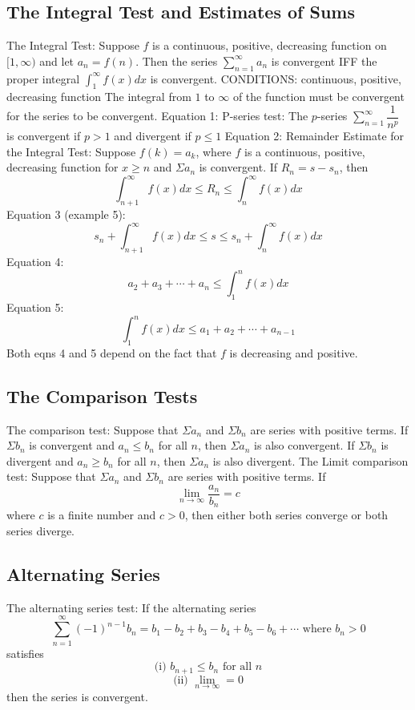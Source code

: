 \documentclass{article}
\begin{document}
    \subsection{The Integral Test and Estimates of Sums}
    \begin{outline}
        \1 The Integral Test: Suppose $f$ is a continuous, positive, decreasing function on \([1,\infty)\) and let \(a_n=f(n)\). Then the series \(\sum^\infty_{n=1}a_n\) is convergent IFF the proper integral \(\int^\infty_1f(x)dx\) is convergent. 
            \2 CONDITIONS: continuous, positive, decreasing function 
            \2 The integral from $1$ to $\infty$ of the function must be convergent for the series to be convergent. 
        \1 Equation 1: P-series test: The $p$-series \(\sum^\infty_{n=1}\dfrac{1}{n^p}\) is convergent if \(p>1\) and divergent if \(p\leq1\)
        \1 Equation 2: Remainder Estimate for the Integral Test: Suppose \(f(k)=a_k\), where $f$ is a continuous, positive, decreasing function for \(x\geq n\) and \(\Sigma a_n\) is convergent. If \(R_n=s-s_n\), then \[\int^\infty_{n+1}f(x)dx\leq R_n\leq\int^\infty_n f(x)dx\]
        \1 Equation 3 (example 5): \[s_n+\int^\infty_{n+1}f(x)dx\leq s\leq s_n+\int^\infty_nf(x)dx\]
        \1 Equation 4: \[a_2+a_3+\cdots+a_n\leq\int^n_1f(x)dx\]
        \1 Equation 5: \[\int^n_1f(x)dx\leq a_1+a_2+\cdots+a_{n-1}\]
            \2 Both eqns 4 and 5 depend on the fact that $f$ is decreasing and positive. 
    \end{outline}
    \subsection{The Comparison Tests}
    \begin{outline}
        \1 The comparison test: Suppose that \(\Sigma a_n\) and \(\Sigma b_n\) are series with positive terms. 
            \2 If \(\Sigma b_n\) is convergent and \(a_n\leq b_n\) for all $n$, then \(\Sigma a_n\) is also convergent. 
            \2 If \(\Sigma b_n\) is divergent and \(a_n\geq b_n\) for all $n$, then \(\Sigma a_n\) is also divergent. 
        \1 The Limit comparison test: Suppose that \(\Sigma a_n\) and \(\Sigma b_n\) are series with positive terms. If \[\lim_{n\to\infty}\dfrac{a_n}{b_n}=c\] where $c$ is a finite number and \(c>0\), then either both series converge or both series diverge. 

    \end{outline}
    \subsection{Alternating Series}
    \begin{outline}
        \1 The alternating series test: If the alternating series \[\sum^\infty_{n=1}(-1)^{n-1}b_n=b_1-b_2+b_3-b_4+b_5-b_6+\cdots \mbox{ where } b_n>0\] satisfies \[\mbox{(i) }b_{n+1}\leq b_n\mbox{ for all }n\]\[\mbox{(ii) }\lim_{n\to\infty}=0\] then the series is convergent. 
    \end{outline}
    
\end{document}
